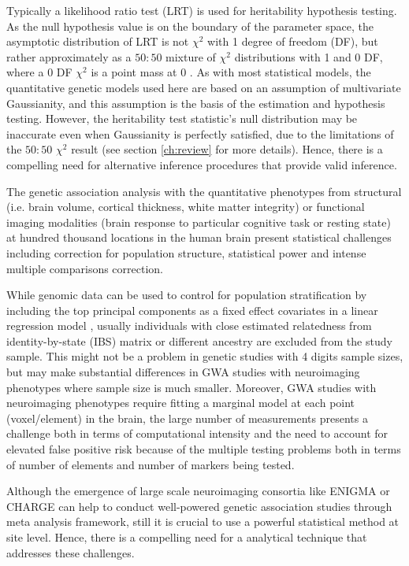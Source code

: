 Typically a likelihood ratio test (LRT) is used for heritability hypothesis testing. As the null hypothesis value is on the boundary of the parameter space, the asymptotic distribution of LRT is not $\chi^2$ with 1 degree of freedom (DF), but rather approximately as a $50:50$ mixture of  $\chi^2$ distributions with 1 and 0 DF, where a 0 DF $\chi^2$ is a point mass at 0 \citep{Chernoff1954,Self1987,Stram1994,Dominicus2006,Verbeke2003}.  
 As with most statistical models, the quantitative genetic models used here are based on an assumption of multivariate Gaussianity, and this assumption is the basis of the estimation and hypothesis testing.  However, the heritability test statistic's null distribution may be inaccurate even when Gaussianity is perfectly satisfied, due to the limitations of the $50:50$ $\chi^2$ result (see section \ref{ch:review} for more details). Hence, there is a compelling need for alternative inference procedures that provide valid inference. 
 

The genetic association analysis with the quantitative phenotypes from structural  (i.e. brain volume, cortical thickness, white matter integrity) or functional imaging modalities (brain response to particular cognitive task or resting state) at hundred thousand locations in the human brain present statistical challenges including correction for population structure, statistical power and intense multiple comparisons correction.

While genomic data can be used to control for population stratification by including the top principal components as a fixed effect covariates in a linear regression model \citep{Price2006}, usually individuals with  close estimated relatedness  from identity-by-state (IBS) matrix  or different ancestry are  excluded from the study sample. This might not be a problem in genetic studies with 4 digits sample sizes, but may make substantial differences in GWA studies with neuroimaging phenotypes where sample size is much smaller.  Moreover, GWA studies with neuroimaging phenotypes require fitting a marginal model at each point (voxel/element) in the brain, the large number of measurements presents a challenge both in terms of computational intensity and the need to account for elevated false positive risk because of the multiple testing problems both in terms of number of elements and number of markers being tested. 


Although the emergence of large scale neuroimaging consortia like ENIGMA or CHARGE can help to conduct well-powered genetic association studies through meta analysis framework, still it is crucial to use a powerful statistical method at site level. Hence, there is a compelling need for a analytical technique that addresses these challenges. 

